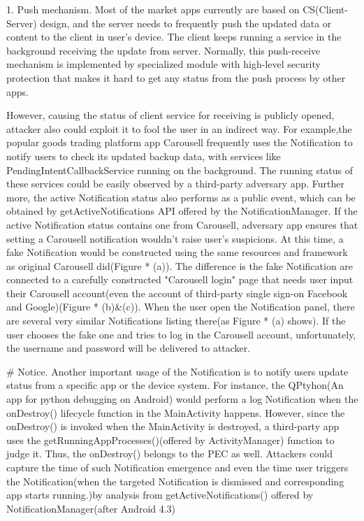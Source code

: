 \documentclass{sig-alternate-05-2015}
\begin{document}
1. Push mechanism. Most of the market apps currently are based on CS(Client-Server) design, and the server needs to frequently push the updated data or content to the client in user's device. The client keeps running a service in the background receiving the update from server. Normally, this push-receive mechanism is implemented by specialized module with high-level security protection that makes it hard to get any status from the push process by other apps. 

However, causing the status of client service for receiving is publicly opened, attacker also could exploit it to fool the user in an indirect way. For example,the popular goods trading platform app Carousell frequently uses the Notification to notify users to check its updated backup data, with services like PendingIntentCallbackService running on the background. The running status of these services could be easily observed by a third-party adversary app.  Further more, the active Notification status also performs as a public event, which can be obtained by getActiveNotifications API offered by the NotificationManager. If the active Notification status contains one from Carousell, adversary app ensures that setting a Carousell notification wouldn't raise user's suspicions. At this time, a fake Notification would be constructed using the same resources and framework as original Carousell did(Figure * (a)). The difference is the fake Notification are connected to a carefully constructed "Carousell login" page that needs user input their Carousell account(even the account of third-party single sign-on Facebook and Google)(Figure * (b)\&(c)). When the user open the Notification panel, there are several very similar Notifications listing there(as Figure * (a) shows). If the user chooses the fake one and tries to log in the Carousell account, unfortunately, the username and password will be delivered to attacker.

\# Notice. Another important usage of the Notification is to notify users update status from a specific app or the device system. For instance, the QPtyhon(An app for python debugging on Android) would perform a log Notification when the onDestroy() lifecycle function in the MainActivity happens. However, since the onDestroy() is invoked when the MainActivity is destroyed, a third-party app uses the getRunningAppProcesses()(offered by ActivityManager) function to judge it. Thus, the onDestroy() belongs to the PEC as well. Attackers could capture the time of such Notification emergence and even the time user triggers the Notification(when the targeted Notification is dismissed and corresponding app starts running.)by analysis from getActiveNotifications() offered by NotificationManager(after Android 4.3) 
\end{document}
